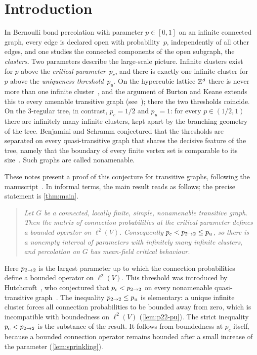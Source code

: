 \section{Introduction}\label{sec:intro}

In Bernoulli bond percolation with parameter $p\in[0,1]$ on an infinite connected graph, every edge is
declared open with probability~$p$, independently of all other edges, and one studies the connected
components of the open subgraph, the \emph{clusters}. Two parameters describe the large-scale picture.
Infinite clusters exist for $p$ above the \emph{critical parameter}~$p_c$, and there is exactly one
infinite cluster for $p$ above the \emph{uniqueness threshold}~$p_u$. On the hypercubic lattice
$\mathbb Z^d$ there is never more than one infinite cluster~\cite{AKN87,BK89}, and the argument of Burton and
Keane extends this to every amenable transitive graph (see~\cite[Chapter~7]{LP16}); there the two
thresholds coincide. On the $3$-regular tree, in contrast, $p_c=1/2$ and $p_u=1$: for every
$p\in(1/2,1)$ there are infinitely many infinite clusters, kept apart by the branching geometry of the
tree. Benjamini and Schramm conjectured that the thresholds are separated on every quasi-transitive
graph that shares the decisive feature of the tree, namely that the boundary of every finite vertex
set is comparable to its size~\cite[Conjecture~6]{BS96}. Such graphs are called nonamenable.

These notes present a proof of this conjecture for transitive graphs, following the
manuscript~\cite{Ope26}. In informal terms, the main result reads as follows; the precise statement is
\cref{thm:main}.

\begin{quote}
\emph{Let $G$ be a connected, locally finite, simple, nonamenable transitive graph. Then the matrix of
connection probabilities at the critical parameter defines a bounded operator on $\ell^2(V)$.
Consequently $p_c<p_{2\to 2}\le p_u$, so there is a nonempty interval of parameters with infinitely many
infinite clusters, and percolation on $G$ has mean-field critical behaviour.}
\end{quote}

Here $p_{2\to 2}$ is the largest parameter up to which the connection probabilities define a bounded
operator on $\ell^2(V)$. This threshold was introduced by Hutchcroft~\cite{Hut19,Hut20L2}, who
conjectured that $p_c<p_{2\to 2}$ on every nonamenable quasi-transitive graph~\cite[Conjecture~1.3]{Hut20L2}.
The inequality $p_{2\to 2}\le p_u$ is elementary: a unique infinite cluster forces all connection
probabilities to be bounded away from zero, which is incompatible with boundedness on $\ell^2(V)$
(\cref{lem:p22-pu}). The strict inequality $p_c<p_{2\to 2}$ is the substance of the result. It follows from
boundedness at $p_c$ itself, because a bounded connection operator remains bounded after a small
increase of the parameter (\cref{lem:sprinkling}).

